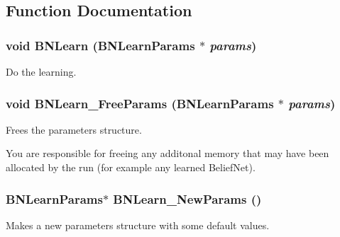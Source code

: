 \subsection{Function Documentation}
\subsubsection{\setlength{\rightskip}{0pt plus 5cm}void BNLearn (BNLearn\-Params $\ast$ {\em params})}\label{bnlearn-engine_8h_a9}


Do the learning. 

\subsubsection{\setlength{\rightskip}{0pt plus 5cm}void BNLearn\_\-Free\-Params (BNLearn\-Params $\ast$ {\em params})}\label{bnlearn-engine_8h_a8}


Frees the parameters structure. 

You are responsible for freeing any additonal memory that may have been allocated by the run (for example any learned Belief\-Net). 
\subsubsection{\setlength{\rightskip}{0pt plus 5cm}BNLearn\-Params$\ast$ BNLearn\_\-New\-Params ()}\label{bnlearn-engine_8h_a7}


Makes a new parameters structure with some default values. 

